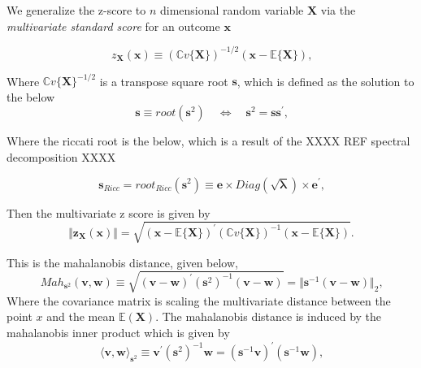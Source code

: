\documentclass[../main.tex]{subfiles}
\begin{document}
\vspace{1cm}

We generalize the z-score to $n$ dimensional random variable $\mathbf{X}$ via 
the \textit{multivariate standard score} for an outcome $\mathbf{x}$

\begin{equation}
    z_{\boldsymbol{X}}\left( \boldsymbol{x}\right) \equiv(\mathbb{C}v\{\boldsymbol{X}\})^{-1/2}(\boldsymbol{x}-\mathbb{E}\{\boldsymbol{X}\})\text{,}
    \end{equation}

Where  $\mathbb{C}v\{\boldsymbol{X}\}^{-1/2}$  is a transpose square root $\mathbf{s}$, which is defined as the solution to the below
\begin{equation}
    \boldsymbol{s}\equiv\mathit{root}(\boldsymbol{s}^{2})\quad\Leftrightarrow \quad\boldsymbol{s}^{2}=\boldsymbol{s}\boldsymbol{s}^{\prime}\text{,}
    \end{equation}

Where the riccati root is the below, which is a result of the
XXXX REF spectral decomposition XXXX

\begin{equation}
    \boldsymbol{s}_{\mathit{Ricc}}=\mathit{root}_{\mathit{Ricc}}(\boldsymbol{s}^{2})\equiv\boldsymbol{e}\times\mathit{Diag}(\sqrt{\boldsymbol{\lambda}})\times\boldsymbol{e}^{\prime}\text{,}
    \end{equation}

Then the multivariate z score is given by 
\begin{equation}
    \Vert\boldsymbol{z}_{\boldsymbol{X}}(\boldsymbol{x})\Vert=\sqrt{(\boldsymbol{x}-\mathbb{E}\{\boldsymbol{X}\})^{\prime}(\mathbb{C}v\{\boldsymbol{X}\})^{-1}(\boldsymbol{x}-\mathbb{E}\{\boldsymbol{X}\})}\text{.}
    \end{equation}

This is the mahalanobis distance, given below,
\begin{equation}
    \mathit{Mah}_{\boldsymbol{s}^{2}}(\boldsymbol{v},\boldsymbol{w})\equiv \sqrt{\left( \boldsymbol{v}-\boldsymbol{w}\right) ^{\prime}(\boldsymbol{s}^{2})^{-1}\left( \boldsymbol{v}-\boldsymbol{w}\right) }=\Vert\boldsymbol{s}^{-1}(\boldsymbol{v}-\boldsymbol{w})\Vert_{2}\text{,}
\end{equation}
Where the covariance matrix is scaling 
the multivariate distance between
the point $x$ and the mean $\mathbb{E}(\mathbf{X})$.
The mahalanobis distance is induced by the mahalanobis
inner product which is given by 
\begin{equation}
    \langle\boldsymbol{v},\boldsymbol{w}\rangle_{\boldsymbol{s}^{2}}\equiv\boldsymbol{v}^{\prime}(\boldsymbol{s}^{2})^{-1}\boldsymbol{w}=(\boldsymbol{s}^{-1}\boldsymbol{v})^{\prime}(\boldsymbol{s}^{-1}\boldsymbol{w})\text{,}
    \end{equation}
\end{document}
